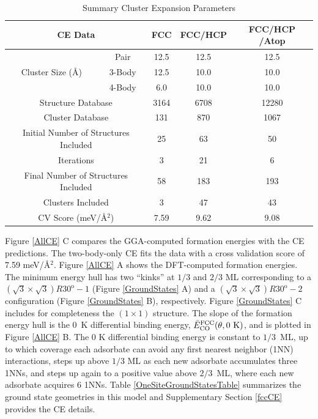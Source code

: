 \documentclass[11pt]{article}
\begin{document}
\begin{table} [t]
	\caption{Summary Cluster Expansion Parameters}
	\centering
	\footnotesize\setlength{\tabcolsep}{2.5pt}
	\begin{tabular}{c c c c c}
		\toprule
		\multicolumn{2}{c}{CE Data} & FCC & FCC/HCP & FCC/HCP /Atop \\
		\midrule
		\multirow{3}{*}{Cluster Size (\AA)} & Pair     & 12.5 & 12.5 & 12.5\\
		& 3-Body   & 12.5 & 10.0 & 10.0\\
		& 4-Body   & 6.0  & 10.0 & 10.0\\
		\multicolumn{2}{c}{Structure Database} & 3164 & 6708 & 12280 \\
		\multicolumn{2}{c}{Cluster Database} & 131 & 870 & 1067 \\
		\multicolumn{2}{c}{Initial Number of Structures Included} & 25 & 63 & 50 \\
		\multicolumn{2}{c}{Iterations} & 3 & 21 & 6 \\
		\multicolumn{2}{c}{Final Number of Structures Included} & 58 & 183 & 193 \\
		\multicolumn{2}{c}{Clusters Included} & 3 & 47 & 43 \\
		\multicolumn{2}{c}{CV Score (meV/\AA$^2$)} & 7.59 & 9.62 & 9.08 \\
		\bottomrule
	\end{tabular}
	\label{CE_Cutoff_Radius}
\end{table}

 Figure \ref{AllCE} C compares the GGA-computed formation energies with the CE predictions.  The two-body-only CE fits the data with a cross validation score of 7.59 meV/\AA$^2$. Figure \ref{AllCE} A shows the DFT-computed formation energies.  The minimum energy hull has two ``kinks''  at $1/3$ and $2/3$ ML corresponding to a $(\sqrt{3} \times \sqrt{3})R30^\mathrm{o}-1$   (Figure \ref{GroundStates} A) and a $(\sqrt{3} \times \sqrt{3})R30^\mathrm{o}-2$  configuration (Figure \ref{GroundStates} B), respectively.  Figure \ref{GroundStates} C includes for completeness the  $(1 \times 1)$ structure.  The slope of the formation energy hull is the 0~K  differential binding energy, $\bar{E}_{\ce{CO}}^{\text{FCC}}(\theta,0~\text{K})$, and is plotted in  Figure \ref{AllCE}  B.  The 0 K differential binding energy is constant to $1/3$~ML, up to which coverage each adsorbate can avoid any first nearest neighbor (1NN) interactions, steps up above $1/3$ ML as each new adsorbate accumulates three 1NNs, and steps up again to a positive value above $2/3$~ML, where each new adsorbate acquires 6 1NNs. Table \ref{OneSiteGroundStatesTable} summarizes the ground state geometries in this model and Supplementary Section \ref{fccCE} provides the CE details. 
\end{document}
